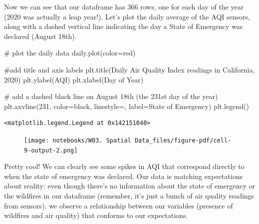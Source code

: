 \documentclass[
  letterpaper,
  DIV=11,
  numbers=noendperiod]{scrreprt}
\newenvironment{Shaded}{\begin{snugshade}}{\end{snugshade}}
\newcommand{\CommentTok}[1]{\textcolor[rgb]{0.37,0.37,0.37}{#1}}
\newcommand{\DecValTok}[1]{\textcolor[rgb]{0.68,0.00,0.00}{#1}}
\newcommand{\NormalTok}[1]{\textcolor[rgb]{0.00,0.23,0.31}{#1}}
\newcommand{\OperatorTok}[1]{\textcolor[rgb]{0.37,0.37,0.37}{#1}}
\newcommand{\StringTok}[1]{\textcolor[rgb]{0.13,0.47,0.30}{#1}}
\begin{document}
Now we can see that our dataframe has 366 rows, one for each day of the
year (2020 was actually a leap year!). Let's plot the daily average of
the AQI sensors, along with a dashed vertical line indicating the day a
State of Emergency was declared (August 18th).

\begin{Shaded}
\begin{Highlighting}[]
\CommentTok{\# plot the daily data}
\NormalTok{daily.plot(color}\OperatorTok{=}\StringTok{\textquotesingle{}red\textquotesingle{}}\NormalTok{)}

\CommentTok{\#add title and axis labels}
\NormalTok{plt.title(}\StringTok{\textquotesingle{}Daily Air Quality Index readings in California, 2020\textquotesingle{}}\NormalTok{)}
\NormalTok{plt.ylabel(}\StringTok{\textquotesingle{}AQI\textquotesingle{}}\NormalTok{)}
\NormalTok{plt.xlabel(}\StringTok{\textquotesingle{}Day of Year\textquotesingle{}}\NormalTok{)}

\CommentTok{\# add a dashed black line on August 18th (the 231st day of the year)}
\NormalTok{plt.axvline(}\DecValTok{231}\NormalTok{, color}\OperatorTok{=}\StringTok{\textquotesingle{}black\textquotesingle{}}\NormalTok{, linestyle}\OperatorTok{=}\StringTok{\textquotesingle{}{-}{-}\textquotesingle{}}\NormalTok{, label}\OperatorTok{=}\StringTok{\textquotesingle{}State of Emergency\textquotesingle{}}\NormalTok{)}
\NormalTok{plt.legend()}
\end{Highlighting}
\end{Shaded}

\begin{verbatim}
<matplotlib.legend.Legend at 0x142151040>
\end{verbatim}

\begin{figure}[H]

{\centering \texttt{[image: notebooks/W03. Spatial Data\_files/figure-pdf/cell-9-output-2.png]}

}

\end{figure}

Pretty cool! We can clearly see some spikes in AQI that correspond
directly to when the state of emergency was declared. Our data is
matching expectations about reality: even though there's no information
about the state of emergency or the wildfires in our dataframe
(remember, it's just a bunch of air quality readings from sensors), we
observe a relationship between our variables (presence of wildfires and
air quality) that conforms to our expectations.
\end{document}
